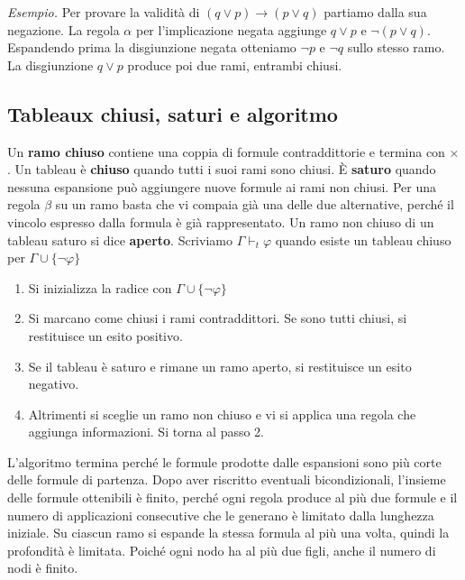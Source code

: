 \medskip
\noindent
\textit{Esempio.} Per provare la validità di
$(q\vee p)\to(p\vee q)$ partiamo dalla sua negazione. La regola
$\alpha$ per l'implicazione negata aggiunge $q\vee p$ e
$\neg(p\vee q)$. Espandendo prima la disgiunzione negata otteniamo
$\neg p$ e $\neg q$ sullo stesso ramo. La disgiunzione $q\vee p$
produce poi due rami, entrambi chiusi.

\begin{center}
\end{center}

\subsection{Tableaux chiusi, saturi e algoritmo}
Un \textbf{ramo chiuso} contiene una coppia di formule
contraddittorie e termina con $\times$. Un tableau è
\textbf{chiuso} quando tutti i suoi rami sono chiusi. È
\textbf{saturo} quando nessuna espansione può aggiungere nuove
formule ai rami non chiusi. Per una regola $\beta$ su un ramo
basta che vi compaia già una delle due alternative, perché il
vincolo espresso dalla formula è già rappresentato. Un ramo non
chiuso di un tableau saturo si dice \textbf{aperto}. Scriviamo
$\Gamma\vdash_t\varphi$ quando esiste un tableau chiuso per
$\Gamma\cup\{\neg\varphi\}$

\begin{enumerate}
    \item Si inizializza la radice con $\Gamma\cup\{\neg\varphi\}$
    \item Si marcano come chiusi i rami contraddittori. Se sono
          tutti chiusi, si restituisce un esito positivo.
    \item Se il tableau è saturo e rimane un ramo aperto, si
          restituisce un esito negativo.
    \item Altrimenti si sceglie un ramo non chiuso e vi si applica
          una regola che aggiunga informazioni. Si torna al passo 2.
\end{enumerate}

\noindent
L'algoritmo termina perché le formule prodotte dalle espansioni
sono più corte delle formule di partenza. Dopo aver riscritto
eventuali bicondizionali, l'insieme delle formule ottenibili è
finito, perché ogni regola produce al più due formule e il numero
di applicazioni consecutive che le generano è limitato dalla
lunghezza iniziale. Su ciascun ramo si espande la stessa formula
al più una volta, quindi la profondità è limitata. Poiché ogni
nodo ha al più due figli, anche il numero di nodi è finito.

